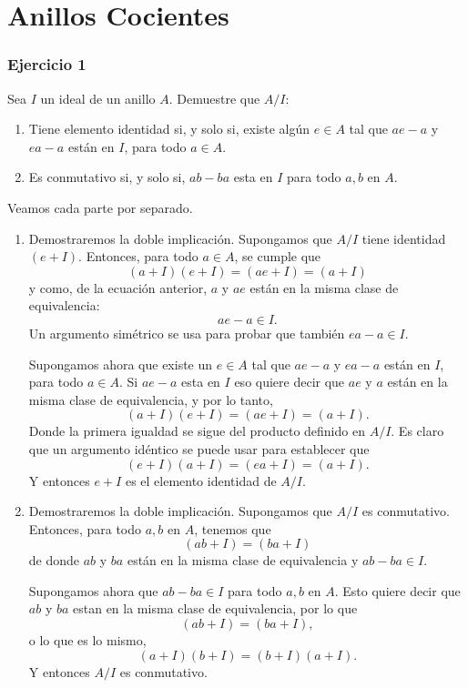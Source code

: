 


\thispagestyle{plain}
\chapter*{Anillos Cocientes}
\subsection*{Ejercicio 1}
    Sea $I$ un ideal de un anillo $A$. Demuestre que $A/I$:
\begin{enumerate}
	\item Tiene elemento identidad si, y solo si, existe algún $e\in A$ tal que $ae-a$ y $ea-a$ están en $I$, para todo $a\in A$.
	\item Es conmutativo si, y solo si, $ab-ba$ esta en $I$ para todo $a,b$ en $A$.
\end{enumerate}
\begin{sol}
	Veamos cada parte por separado. 
	\begin{enumerate}
		\item Demostraremos la doble implicación. Supongamos que $A/I$ tiene identidad $(e + I)$. Entonces, para todo $a\in A$, se cumple que
		\[ (a+I)(e+I) = (ae + I) = (a+I) \]
		y como, de la ecuación anterior, $a$ y $ae$ están en la misma clase de equivalencia:
		\[ ae-a\in I. \]
		Un argumento simétrico se usa para probar que también $ea-a\in I$.
		
		Supongamos ahora que existe un $e\in A$ tal que $ae-a$ y $ea-a$ están en $I$, para todo $a\in A$. Si $ae-a$ esta en $I$ eso quiere decir que $ae$ y $a$ están en la misma clase de equivalencia, y por lo tanto,
		\[ (a+I)(e+I) = (ae + I) = (a+I). \]
		Donde la primera igualdad se sigue del producto definido en $A/I$. Es claro que un argumento idéntico se puede usar para establecer que
		\[ (e+I)(a+I) = (ea+I) = (a+I). \]
		Y entonces $e+I$ es el elemento identidad de $A/I$.
		\item Demostraremos la doble implicación. Supongamos que $A/I$ es conmutativo. Entonces, para todo $a,b$ en $A$, tenemos que
		\[ (ab+I) = (ba+I) \]
		de donde $ab$ y $ba$ están en la misma clase de equivalencia y $ab-ba\in I$.
		
		Supongamos ahora que $ab-ba\in I$ para todo $a,b$ en $A$. Esto quiere decir que $ab$ y $ba$ estan en la misma clase de equivalencia, por lo que 
		\[ (ab+I) = (ba+I), \]
		o lo que es lo mismo,
		\[ (a+I)(b+I) = (b+I)(a+I). \]
		Y entonces $A/I$ es conmutativo.
	\end{enumerate}
\end{sol}
